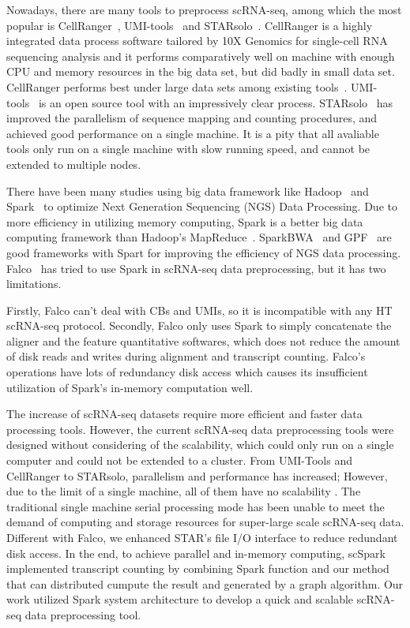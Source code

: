 \documentclass[10pt,journal,compsoc]{IEEEtran}
\begin{document}
Nowadays, there are many tools to preprocess scRNA-seq, among which the most popular is CellRanger~\cite{Zheng2017Massively}, UMI-tools~\cite{Smith2017UMItools} and STARsolo~\cite{Blibaum2019STARsolo}. 
CellRanger is a highly integrated data process software tailored by 10X Genomics for single-cell RNA sequencing analysis and it performs comparatively well on machine with enough CPU and memory resources in the big data set, but did badly in small data set. CellRanger performs best under large data sets among existing tools~\cite{Gao2020Comparison}.
UMI-tools~\cite{ref_url1} is an open source tool with an impressively clear process.
STARsolo~\cite{Blibaum2019STARsolo} has improved the parallelism of sequence mapping and counting procedures, and achieved good performance on a single machine.
It is a pity that all avaliable tools only run on a single machine with slow running speed, and cannot be extended to multiple nodes.

There have been many studies using big data framework like Hadoop~\cite{ref_url2} and Spark~\cite{ref_url3} to optimize Next Generation Sequencing (NGS) Data Processing. 
Due to more efficiency in utilizing memory computing, Spark is a better big data computing framework than Hadoop's MapReduce~\cite{Dean2008MapReduce, Zaharia2012Resilient}. 
SparkBWA~\cite{Abun2016SparkBWA} and GPF~\cite{Li2018Highperformance} are good frameworks with Spart for improving the efficiency of NGS data processing. 
Falco~\cite{Yang2017Falco} has tried to use Spark in scRNA-seq data preprocessing, but it has two limitations. 

Firstly, Falco can't deal with CBs and UMIs, so it is incompatible with any HT scRNA-seq protocol.
Secondly, Falco only uses Spark to simply concatenate the aligner and the feature quantitative softwares, which does not reduce the amount of disk reads and writes during alignment and transcript counting.
Falco’s operations have lots of redundancy disk access which causes its insufficient utilization of Spark’s in-memory computation well. 

The increase of scRNA-seq datasets require more efficient and faster data processing tools. However, the current scRNA-seq data preprocessing tools were designed without considering of the scalability, which could only run on a single computer and could not be extended to a cluster. From UMI-Tools and CellRanger to STARsolo, parallelism and performance has increased; However, due to the limit of a single machine, all of them have no scalability . 
The traditional single machine serial processing mode has been unable to meet the demand of computing and storage resources for super-large scale scRNA-seq data.
Different with Falco, we enhanced STAR's file I/O interface to reduce redundant disk access.
In the end, to achieve parallel and in-memory computing, scSpark implemented transcript counting by combining Spark function and our method that can distributed cumpute the result and generated by a graph algorithm.
Our work utilized Spark system architecture to develop a quick and scalable scRNA-seq data preprocessing tool. 
\end{document}
